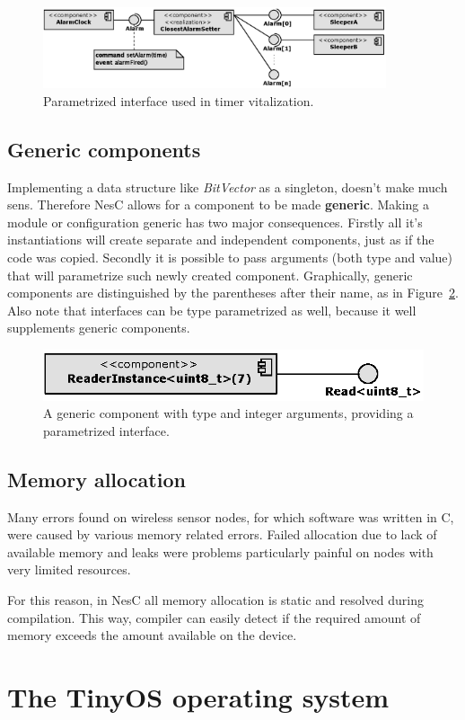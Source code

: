\begin{figure}[h]
  \centering
  \includegraphics[width=0.9\textwidth]{diagrams/parametrized_interface.eps}
  \caption{Parametrized interface used in timer vitalization.}
  \label{fig:parametrized_interface}
\end{figure}

\subsection{Generic components}

Implementing a data structure like \emph{BitVector} as a singleton,
doesn't make much sens. Therefore NesC allows for a component to be
made {\bf generic}. Making a module or configuration generic has two
major consequences.  Firstly all it's instantiations will create
separate and independent components, just as if the code was copied.
Secondly it is possible to pass arguments (both type and value) that
will parametrize such newly created component. Graphically, generic
components are distinguished by the parentheses after their name, as
in Figure~\ref{fig:generic_component}. Also note that interfaces can
be type parametrized as well, because it well supplements generic
components.

\begin{figure}[h]
  \centering
  \includegraphics{diagrams/generic_component.eps}
  \caption{A generic component with type and integer arguments,
  providing a parametrized interface.}
  \label{fig:generic_component}
\end{figure}

\subsection{Memory allocation}
Many errors found on wireless sensor nodes, for which software was
written in C, were caused by various memory related errors. Failed
allocation due to lack of available memory and leaks were problems
particularly painful on nodes with very limited resources.

For this reason, in NesC all memory allocation is static and resolved
during compilation. This way, compiler can easily detect if the
required amount of memory exceeds the amount available on the device.

\section{The TinyOS operating system}


